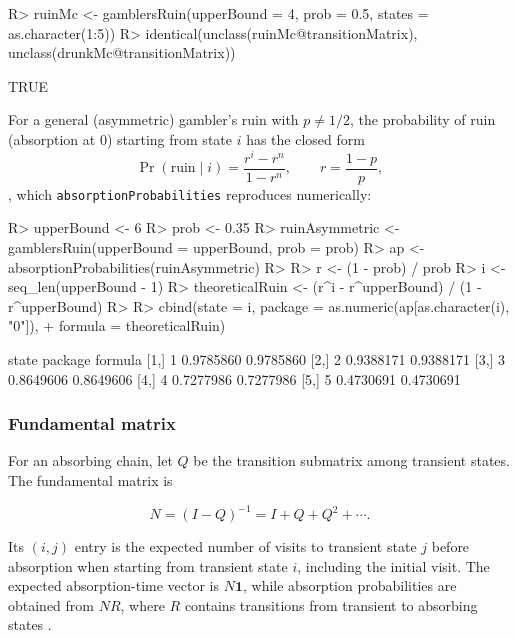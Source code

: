 \documentclass[
  nojss]{jss}
\begin{document}
\begin{CodeChunk}
\begin{CodeInput}
R> ruinMc <- gamblersRuin(upperBound = 4, prob = 0.5, states = as.character(1:5))
R> identical(unclass(ruinMc@transitionMatrix), unclass(drunkMc@transitionMatrix))
\end{CodeInput}
\begin{CodeOutput}
[1] TRUE
\end{CodeOutput}
\end{CodeChunk}

For a general (asymmetric) gambler's ruin with \(p\ne 1/2\), the probability
of ruin (absorption at \(0\)) starting from state \(i\) has the closed form
\[
\Pr(\text{ruin} \mid i) = \frac{r^i-r^n}{1-r^n}, \qquad r=\frac{1-p}{p},
\]
\citep{GrinsteadSnell}, which \texttt{absorptionProbabilities} reproduces
numerically:

\begin{CodeChunk}
\begin{CodeInput}
R> upperBound <- 6
R> prob <- 0.35
R> ruinAsymmetric <- gamblersRuin(upperBound = upperBound, prob = prob)
R> ap <- absorptionProbabilities(ruinAsymmetric)
R> 
R> r <- (1 - prob) / prob
R> i <- seq_len(upperBound - 1)
R> theoreticalRuin <- (r^i - r^upperBound) / (1 - r^upperBound)
R> 
R> cbind(state = i, package = as.numeric(ap[as.character(i), "0"]),
+       formula = theoreticalRuin)
\end{CodeInput}
\begin{CodeOutput}
     state   package   formula
[1,]     1 0.9785860 0.9785860
[2,]     2 0.9388171 0.9388171
[3,]     3 0.8649606 0.8649606
[4,]     4 0.7277986 0.7277986
[5,]     5 0.4730691 0.4730691
\end{CodeOutput}
\end{CodeChunk}

\subsubsection{Fundamental matrix}\label{fundamental-matrix}

For an absorbing chain, let \(Q\) be the transition submatrix among transient
states. The fundamental matrix is

\begin{equation}
N=(I-Q)^{-1}=I+Q+Q^2+\cdots.
\end{equation}

Its \((i,j)\) entry is the expected number of visits to transient state \(j\) before
absorption when starting from transient state \(i\), including the initial visit.
The expected absorption-time vector is \(N\mathbf{1}\), while absorption
probabilities are obtained from \(NR\), where \(R\) contains transitions from
transient to absorbing states \citep{GrinsteadSnell}.
\end{document}
